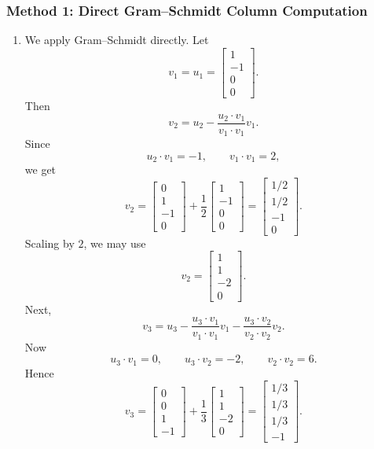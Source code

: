 \documentclass[12pt]{article}
\begin{document}
\subsubsection{Method 1: Direct Gram--Schmidt Column Computation}
\begin{enumerate}[label=(\alph*)]
  \item We apply Gram--Schmidt directly. Let
  \[
  v_1=u_1=\begin{bmatrix}1\\-1\\0\\0\end{bmatrix}.
  \]
  Then
  \[
  v_2=u_2-\frac{u_2\cdot v_1}{v_1\cdot v_1}v_1.
  \]
  Since
  \[
  u_2\cdot v_1=-1,
  \qquad
  v_1\cdot v_1=2,
  \]
  we get
  \[
  v_2=\begin{bmatrix}0\\1\\-1\\0\end{bmatrix}+\frac12\begin{bmatrix}1\\-1\\0\\0\end{bmatrix}
  =\begin{bmatrix}1/2\\1/2\\-1\\0\end{bmatrix}.
  \]
  Scaling by $2$, we may use
  \[
  v_2=\begin{bmatrix}1\\1\\-2\\0\end{bmatrix}.
  \]
  Next,
  \[
  v_3=u_3-\frac{u_3\cdot v_1}{v_1\cdot v_1}v_1-\frac{u_3\cdot v_2}{v_2\cdot v_2}v_2.
  \]
  Now
  \[
  u_3\cdot v_1=0,
  \qquad
  u_3\cdot v_2=-2,
  \qquad
  v_2\cdot v_2=6.
  \]
  Hence
  \[
  v_3=\begin{bmatrix}0\\0\\1\\-1\end{bmatrix}+\frac13\begin{bmatrix}1\\1\\-2\\0\end{bmatrix}
  =\begin{bmatrix}1/3\\1/3\\1/3\\-1\end{bmatrix}.
\]
\end{enumerate}
\end{document}

